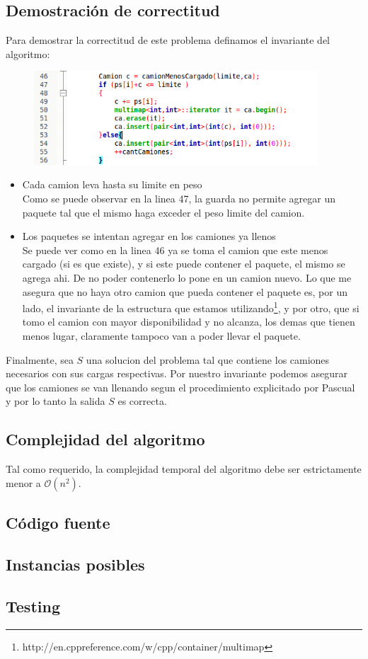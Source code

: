 \subsection{Demostración de correctitud}

Para demostrar la correctitud de este problema definamos el invariante del algoritmo:
\begin{figure}[H] %
\begin{center}
\includegraphics[width=300pt]{../imgs/demo11.png}
\end{center}
\end{figure}

\begin{itemize}
\item Cada camion leva hasta su limite en peso \\
Como se puede observar en la linea 47, la guarda no permite agregar un paquete tal que el mismo haga exceder el peso limite del camion.
\item Los paquetes se intentan agregar en los camiones ya llenos \\
 Se puede ver como en la linea 46 ya se toma el camion que este menos cargado (si es que existe), y si este puede contener el paquete, el mismo se agrega ahi. De no poder contenerlo lo pone en un camion nuevo. Lo que me asegura que no haya otro camion que pueda contener el paquete es, por un lado, el invariante de la estructura que estamos utilizando\footnote{http://en.cppreference.com/w/cpp/container/multimap}, y por otro, que si tomo el camion con mayor disponibilidad y no alcanza, los demas que tienen menos lugar, claramente tampoco van a poder llevar el paquete. 
\end{itemize}

Finalmente, sea $S$ una solucion del problema tal que contiene los camiones necesarios con sus cargas respectivas. Por nuestro invariante podemos asegurar que los camiones se van llenando segun el procedimiento explicitado por Pascual y por lo tanto la salida $S$ es correcta.


\subsection{Complejidad del algoritmo}
Tal como requerido, la complejidad temporal del algoritmo debe ser estrictamente menor a $\mathcal{O}(n^2)$.


\subsection{Código fuente}



\subsection{Instancias posibles}



\subsection{Testing}
